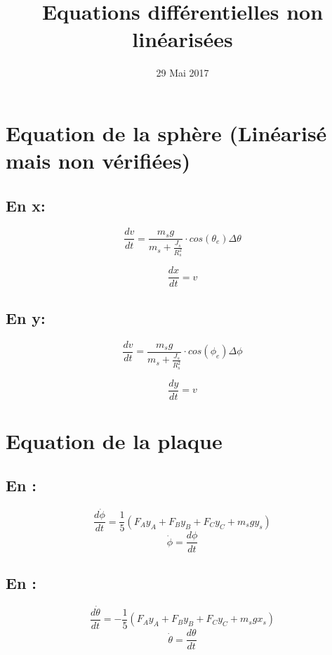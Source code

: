 \documentclass{article}
\title{Equations différentielles non linéarisées}
\date{29 Mai 2017}
\begin{document}
\maketitle

\section{Equation de la sphère (Linéarisé mais non vérifiées)}
\subsection{En x:}
\begin{equation}
    \frac{dv}{dt} = \frac{m_s g}{m_s + \frac{J_s}{R_s^2}} \cdot cos(\theta_e) \Delta \theta
\end{equation}

\begin{equation}
    \frac{dx}{dt} = v
\end{equation}

\subsection{En y:}
\begin{equation}
    \frac{dv}{dt} = \frac{m_s g}{m_s + \frac{J_s}{R_s^2}} \cdot cos(\phi_e) \Delta \phi
\end{equation}

\begin{equation}
    \frac{dy}{dt} = v
\end{equation}

\section{Equation de la plaque}


\subsection{En \phi:}
\begin{equation}
    \frac{d\dot \phi}{dt} = \frac{1}{5} (F_A y_A + F_B y_B + F_C y_C + m_s g y_s)
\end{equation}
\begin{equation}
   \dot \phi  = \frac{d \phi}{dt}
\end{equation}

\subsection{En \theta:}
\begin{equation}
    \frac{d\dot \theta}{dt} = -\frac{1}{5} (F_A y_A + F_B y_B + F_C y_C + m_s g x_s)
\end{equation}
\begin{equation}
   \dot \theta  = \frac{d \theta}{dt}
\end{equation}
\end{document}
